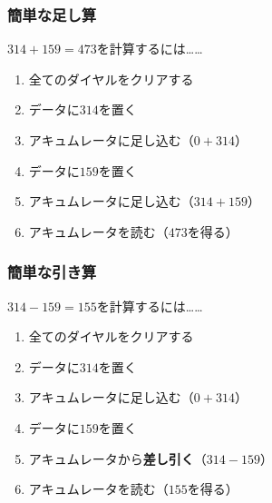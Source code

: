 \documentclass[
  lualatex,
  aspectratio=169,
  fleqn,
  14pt
]{beamer}
\begin{document}
\begin{frame}
  \frametitle{簡単な足し算}

  $314+159=473$を計算するには……

  \begin{enumerate}
    \item
      全てのダイヤルをクリアする
    \item
      データに$314$を置く
    \item
      アキュムレータに足し込む（$0+314$）
    \item
      データに$159$を置く
    \item
      アキュムレータに足し込む（$314+159$）
    \item
      アキュムレータを読む（$473$を得る）
  \end{enumerate}

\end{frame}

\begin{frame}
  \frametitle{簡単な引き算}

  $314-159=155$を計算するには……

  \begin{enumerate}
    \item
      全てのダイヤルをクリアする
    \item
      データに$314$を置く
    \item
      アキュムレータに足し込む（$0+314$）
    \item
      データに$159$を置く
    \item
      アキュムレータから\textbf{差し引く}（$314-159$）
    \item
      アキュムレータを読む（$155$を得る）
  \end{enumerate}

\end{frame}
\end{document}
